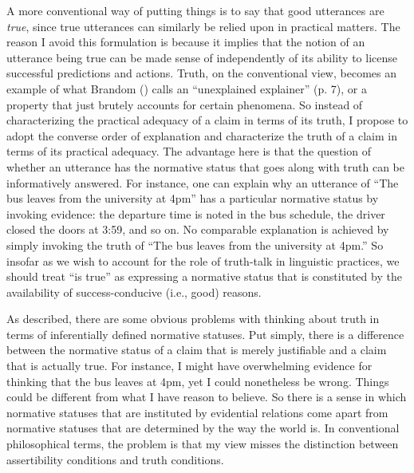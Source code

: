 A more conventional way of putting things is to say that good utterances are \textit{true}, since true utterances can similarly be relied upon in practical matters. The reason I avoid this formulation is because it implies that the notion of an utterance being true can be made sense of independently of its ability to license successful predictions and actions. Truth, on the conventional view, becomes an example of what Brandom (\citeyear{Brandom:1994}) calls an ``unexplained explainer'' (p. 7), or a property that just brutely accounts for certain phenomena. So instead of characterizing the practical adequacy of a claim in terms of its truth, I propose to adopt the converse order of explanation and characterize the truth of a claim in terms of its practical adequacy. The advantage here is that the question of whether an utterance has the normative status that goes along with truth can be informatively answered. For instance, one can explain why an utterance of ``The bus leaves from the university at 4pm'' has a particular normative status by invoking evidence: the departure time is noted in the bus schedule, the driver closed the doors at 3:59, and so on. No comparable explanation is achieved by simply invoking the truth of ``The bus leaves from the university at 4pm.'' So insofar as we wish to account for the role of truth-talk in linguistic practices, we should treat ``is true'' as expressing a normative status that is constituted by the availability of success-conducive (i.e., good) reasons.

As described, there are some obvious problems with thinking about truth in terms of inferentially defined normative statuses. Put simply, there is a difference between the normative status of a claim that is merely justifiable and a claim that is actually true. For instance, I might have overwhelming evidence for thinking that the bus leaves at 4pm, yet I could nonetheless be wrong. Things could be different from what I have reason to believe. So there is a sense in which normative statuses that are instituted by evidential relations come apart from normative statuses that are determined by the way the world is. In conventional philosophical terms, the problem is that my view misses the distinction between assertibility conditions and truth conditions.

